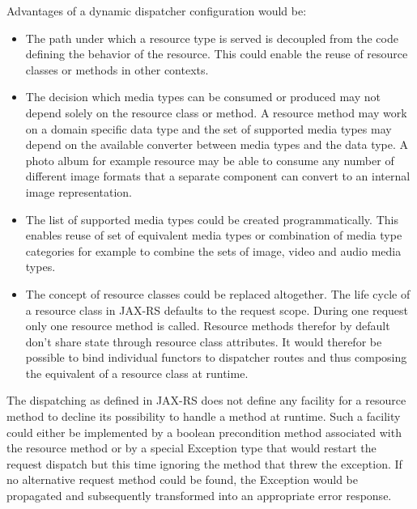 \documentclass[12pt,a4paper,twoside]{scrartcl}		%
\begin{document}
Advantages of a dynamic dispatcher configuration would be:


\begin{itemize}
\item The path under which a resource type is served is decoupled from the code
  defining the behavior of the resource. This could enable the reuse of resource
  classes or methods in other contexts.
\item The decision which media types can be consumed or produced may not depend
  solely on the resource class or method. A resource method may work on a domain
  specific data type and the set of supported media types may depend on the
  available converter between media types and the data type. A photo album for example
  resource may be able to consume any number of different image formats that
  a separate component can convert to an internal image representation.
\item The list of supported media types could be created programmatically. This
  enables reuse of set of equivalent media types or combination of media type
  categories for example to combine the sets of image, video and audio media
  types.
\item The concept of resource classes could be replaced altogether. The life
  cycle of a resource class in JAX-RS defaults to the request scope. During one
  request only one resource method is called. Resource methods therefor by
  default don't share state through resource class attributes. It would therefor
  be possible to bind individual functors to dispatcher routes and thus
  composing the equivalent of a resource class at runtime.
\end{itemize}


The dispatching as defined in JAX-RS does not define any facility for a resource
method to decline its possibility to handle a method at runtime. Such a facility
could either be implemented by a boolean precondition method associated with the
resource method or by a special Exception type that would restart the request
dispatch but this time ignoring the method that threw the exception. If no
alternative request method could be found, the Exception would be propagated and
subsequently transformed into an appropriate error response.
\end{document}
